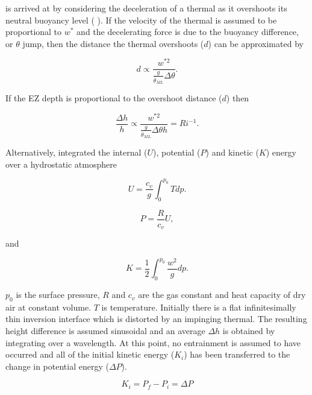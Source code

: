  is arrived at by considering the deceleration of a thermal
as it overshoots its neutral buoyancy level (\citeauthor{StullNelEl} \citeyear{StullNelEl}).  If the velocity of the thermal is assumed to be
proportional to $w^{*}$ and the decelerating force is due to the buoyancy difference, or $\theta$ jump, then the distance the thermal overshoots
($d$) can be approximated by

\begin{equation}
d \propto \frac{w^{*2}}{\frac{g}{\overline{\theta}_{ML}} \Delta \theta}. 
\end{equation} 

If the \acs{EZ} depth is proportional to the overshoot distance ($d$) then

\begin{equation}
\frac{\Delta h}{h} \propto \frac{w^{*2}}{\frac{g}{\overline{\theta}_{ML}} \Delta \theta h} = Ri^{-1}. 
\end{equation} 

Alternatively, \citeauthor{Boers89} \citeyear{Boers89} integrated the internal ($U$), potential ($P$) and kinetic ($K$) energy over a hydrostatic atmosphere

\begin{equation}
U = \frac{c_{v}}{g}\int^{p_{0}}_{0}Tdp.
\end{equation}

\begin{equation}
P = \frac{R}{c_{v}}U,
\end{equation}

and

\begin{equation}
K = \frac{1}{2} \int^{p_{0}}_{0}\frac{w^{2}}{g}dp.
\end{equation}

$p_{0}$ is the surface pressure, $R$ and $c_{v}$ are the gas constant and heat capacity of dry air at constant volume.
$T$ is temperature.  Initially there is a flat infinitesimally thin inversion interface  which is distorted by an
impinging thermal.  The resulting height difference is assumed sinusoidal and an average $\Delta h$ is obtained by integrating 
over a wavelength.  At this point, no entrainment is assumed to have occurred and all of the initial kinetic energy ($K_{i}$) has been transferred to the change in potential energy ($\Delta P$).

\begin{equation}
K_{i} = P_{f} - P_{i} = \Delta P
\end{equation}

